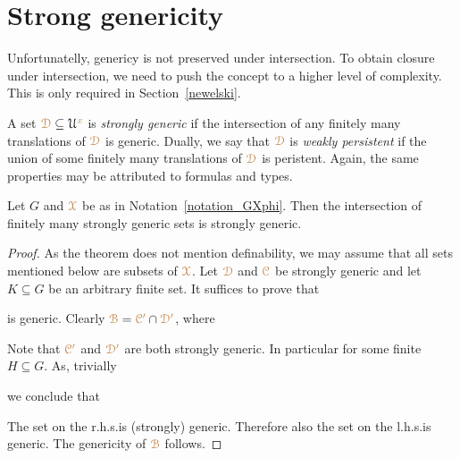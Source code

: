 \section{Strong genericity}\label{strong_genericity}

Unfortunatelly, genericy is not preserved under intersection.
To obtain closure under intersection, we need to push the concept to a higher level of complexity.
This is only required in Section~\ref{newelski}.

A set ${\color{brown}\EuScript D}\subseteq\EuScript U^{\color{brown} x}$ is \emph{strongly generic\/} if the intersection of any finitely many translations of ${\color{brown}\EuScript D}$ is generic.
Dually, we say that ${\color{brown}\EuScript D}$ is \emph{weakly persistent\/} if the union of some finitely many translations of ${\color{brown}\EuScript D}$ is peristent.
Again, the same properties may be attributed to formulas and types.

\begin{lemma}\label{lem_strongly_generic}
  Let $G$ and ${\color{brown}\EuScript X}$ be as in Notation~\ref{notation_GXphi}.
  Then the intersection of finitely many strongly generic sets is strongly generic.
\end{lemma}

\begin{proof}
  As the theorem does not mention definability, we may assume that all sets mentioned below are subsets of ${\color{brown}\EuScript X}$.
  Let ${\color{brown}\EuScript D}$ and ${\color{brown}\EuScript C}$ be strongly generic and let $K\subseteq G$ be an arbitrary finite set.
  It suffices to prove that 
  

  is generic. 
  Clearly ${\color{brown}\EuScript B}={\color{brown}\EuScript C'}\cap{\color{brown}\EuScript D'}$, where
  

  Note that ${\color{brown}\EuScript C'}$ and ${\color{brown}\EuScript D'}$ are both strongly generic.
  In particular  for some finite $H\subseteq G$.
  As, trivially


  we conclude that
  

  The set on the r.h.s.\@ is (strongly) generic.
  Therefore also the set on the l.h.s.\@ is generic.
  The genericity of ${\color{brown}\EuScript B}$ follows.
\end{proof}

